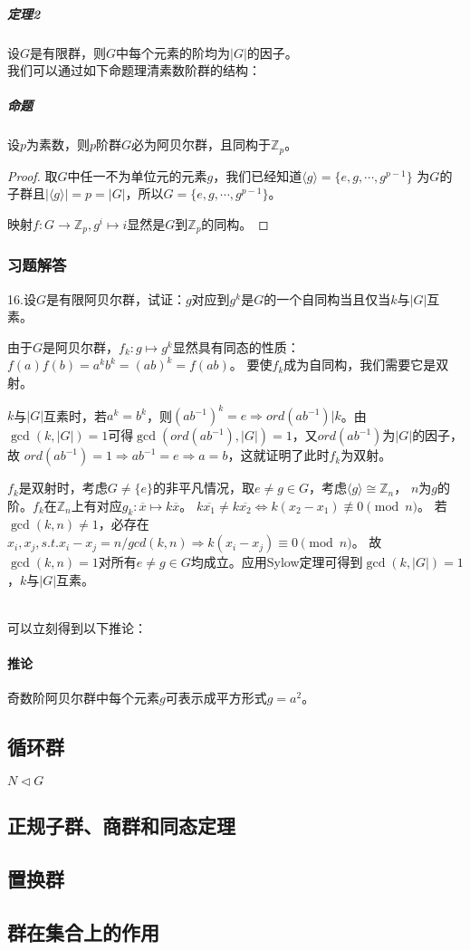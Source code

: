 \documentclass{article}
\begin{document}
\subparagraph{定理2} 设$G$是有限群，则$G$中每个元素的阶均为$|G|$的因子。\\

我们可以通过如下命题理清素数阶群的结构：

\subparagraph{命题} 设$p$为素数，则$p$阶群$G$必为阿贝尔群，且同构于$\mathbb{Z}_p$。

\begin{proof}
    取$G$中任一不为单位元的元素$g$，我们已经知道$\langle g \rangle=\{ e,g,\cdots,g^{p-1}\}$
    为$G$的子群且$|\langle g \rangle|=p=|G|$，所以$G=\{ e,g,\cdots,g^{p-1} \}$。

    映射$f:G \to \mathbb{Z}_p, g^i \mapsto i$显然是$G$到$\mathbb{Z}_p$的同构。
\end{proof}

\subsubsection*{习题解答}
16.设$G$是有限阿贝尔群，试证：$g$对应到$g^k$是$G$的一个自同构当且仅当$k$与$|G|$互素。

由于$G$是阿贝尔群，$f_k: g \mapsto g^k$显然具有同态的性质：$f(a)f(b)=a^kb^k=(ab)^k=f(ab)$。
要使$f_k$成为自同构，我们需要它是双射。

$k$与$|G|$互素时，若$a^k=b^k$，则$(ab^{-1})^k=e \Rightarrow ord(ab^{-1}) | k$。由
$\gcd(k,|G|)=1$可得$\gcd(ord(ab^{-1}), |G|)=1$，又$ord(ab^{-1})$为$|G|$的因子，故
$ord(ab^{-1})=1 \Rightarrow ab^{-1}=e \Rightarrow a=b$，这就证明了此时$f_k$为双射。

$f_k$是双射时，考虑$G \neq \{e\}$的非平凡情况，取$e \neq g \in G$，考虑$\langle g \rangle \cong \mathbb{Z}_n$，
$n$为$g$的阶。$f_k$在$\mathbb{Z}_n$上有对应$g_k:\overline{x} \mapsto k\overline{x}$。
$k\overline{x_1} \neq k\overline{x_2} \Leftrightarrow k(x_2-x_1) \not\equiv 0 \pmod{n}$。
若$\gcd(k,n) \neq 1$，必存在$x_i,x_j, s.t. x_i-x_j=n/gcd(k,n) \Rightarrow k(x_i-x_j) \equiv 0 \pmod{n}$。
故$\gcd(k,n)=1$对所有$e \neq g \in G$均成立。应用Sylow定理可得到$\gcd(k,|G|)=1$，$k$与$|G|$互素。

~\\
可以立刻得到以下推论：
\paragraph{推论} 奇数阶阿贝尔群中每个元素$g$可表示成平方形式$g=a^2$。

\subsection{循环群}

$N\lhd G$

\subsection{正规子群、商群和同态定理}

\subsection{置换群}

\subsection{群在集合上的作用}
\end{document}
